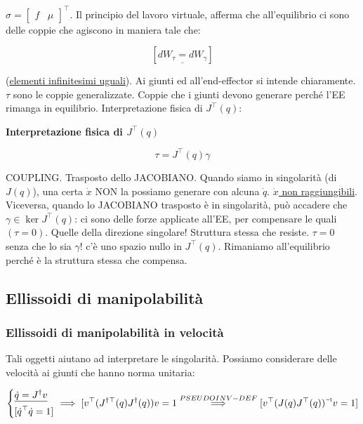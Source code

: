 $\sigma=\begin{bmatrix}f&\mu\end{bmatrix}^\top$. Il principio del lavoro virtuale, afferma che all'equilibrio ci sono delle coppie che agiscono in maniera tale che:

\[
	[\underline{dW_\tau = dW_\gamma}]
\]

(\underline{elementi infinitesimi uguali}). Ai giunti ed all'end-effector si intende chiaramente. $\tau$ sono le coppie generalizzate. Coppie che i giunti devono generare perché l'EE rimanga in equilibrio. Interpretazione fisica di $J^\top(q)$:

\begin{thrm}{\textbf{Interpretazione fisica di $J^\top(q)$}}

\[
	\tau=J^\top(q)\gamma
\]

\end{thrm}

COUPLING. Trasposto dello JACOBIANO. Quando siamo in singolarità (di $J(q)$), una certa $\dot{x}$ NON la possiamo generare con alcuna $\dot{q}$. \underline{$\dot{x}$ non raggiungibili}.
Viceversa, quando lo JACOBIANO trasposto è in singolarità, può accadere che $\gamma\in\ker{J^\top(q)}$: ci sono delle forze applicate all'EE, per compensare le quali $(\tau=0)$. Quelle della direzione singolare! Struttura stessa che resiste. $\tau=0$ senza che lo sia $\gamma$! c'è uno spazio nullo in $J^\top(q)$. Rimaniamo all'equilibrio perché è la struttura stessa che compensa.

\subsection{Ellissoidi di manipolabilità}

\subsubsection{Ellissoidi di manipolabilità in velocità}

Tali oggetti aiutano ad interpretare le singolarità. Possiamo considerare delle velocità ai giunti che hanno norma unitaria:

\[
	\left\{
	\begin{aligned}
	&\underline{\dot{q}=J^\dag v}\\
	&[\dot{q}^\top\dot{q}=1]
	\end{aligned}
	\right.\implies [v^\top(J^{\dag\top}(q)J^\dag(q))v = 1 \stackrel{PSEUDOINV-DEF}{\implies} [v^\top\inv{(J(q)J^\top(q))}v=1]
\]

